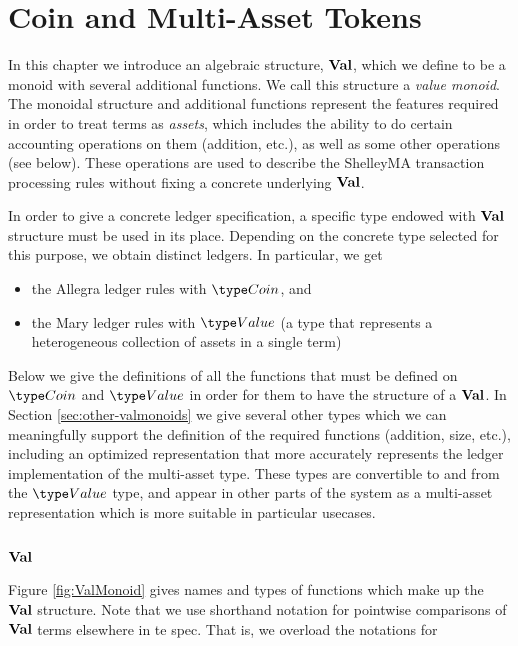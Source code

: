 \section{Coin and Multi-Asset Tokens}
\label{sec:coin-ma}

In this chapter we introduce an algebraic structure, $\mathbf{Val}$,
which we define to be a monoid with several additional functions.
We call this structure a \emph{value monoid}.
The monoidal structure and additional functions represent the
features required in order to treat terms as \emph{assets},
which includes the ability to do certain accounting operations on them (addition, etc.),
as well as some other operations (see below).
These operations are used to describe the ShelleyMA transaction processing rules
without fixing a concrete underlying $\mathbf{Val}$.

In order to give a concrete ledger specification, a specific type
endowed with $\mathbf{Val}$ structure must be used in its place.
Depending on the concrete type selected for this purpose,
we obtain distinct ledgers. In particular, we get

\begin{itemize}
  \item the Allegra ledger rules with $\Coin$, and
  \item the Mary ledger rules with $\Value$ (a type that represents a heterogeneous collection of assets in a
  single term)
\end{itemize}

Below we give the definitions of all the functions that must be defined on
$\Coin$ and $\Value$ in order for them to have the structure of a $\mathbf{Val}$.
In Section \ref{sec:other-valmonoids} we give several other types which we can meaningfully
support the definition of the required functions (addition, size, etc.), including
an optimized representation that more accurately represents the ledger implementation
of the multi-asset type.
These types are convertible to and from the $\Value$ type, and appear in other
parts of the system as a multi-asset representation which is more suitable in particular
usecases.

\subsection{$\mathbf{Val}$}

Figure \ref{fig:ValMonoid} gives names and types of functions which
make up the $\mathbf{Val}$ structure. Note that we use shorthand notation
for pointwise comparisons of $\mathbf{Val}$ terms elsewhere in te spec. That is,
we overload the notations for


